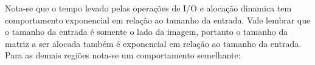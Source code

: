 \documentclass[12pt]{article}
\begin{document}
\begin{figure}[H]
\end{figure}

Nota-se que o tempo levado pelas operações de I/O e alocação dinamica tem comportamento exponencial em relação ao tamanho da entrada. Vale lembrar que o tamanho da entrada é somente o lado da imagem, portanto o tamanho da matriz a ser alocada também é exponencial em relação ao tamanho da entrada. Para as demais regiões nota-se um comportamento semelhante:
\end{document}
